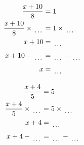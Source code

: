 \documentclass[12pt]{article}
\newcounter{minipagecount}
\begin{document}
\begin{multicols}{2}
\begin{minipage}[t]{0.45\textwidth}
    \raggedright %
    \begin{align*} %
        \frac{x + 10}{8} &= 1\\
        \frac{x + 10}{8} \times\dotuline{\hspace{5mm}} &= 1 \times\dotuline{\hspace{5mm}}\\
        x + 10 &= \dotuline{\hspace{5mm}}\\
        x + 10 - \dotuline{\hspace{5mm}} &= \dotuline{\hspace{5mm}} - \dotuline{\hspace{5mm}}\\
        x &= \dotuline{\hspace{5mm}}\\
    \end{align*}
\end{minipage} %
\noindent{(\theminipagecount)}\hspace{0.1mm} %
\begin{minipage}[t]{0.45\textwidth} %
    \vspace{-26pt}  %
    \raggedright %
    \begin{align*} %
        \frac{x + 4}{5} &= 5\\
        \frac{x + 4}{5} \times\dotuline{\hspace{5mm}} &= 5 \times\dotuline{\hspace{5mm}}\\
        x + 4 &= \dotuline{\hspace{5mm}}\\
        x + 4 - \dotuline{\hspace{5mm}} &= \dotuline{\hspace{5mm}} - \dotuline{\hspace{5mm}}\\

\end{align*}
\end{minipage}
\end{multicols}
\end{document}
